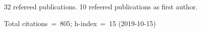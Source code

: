 32 refereed publications. 10 refeered publications as first author.

Total citations~=~805; h-index~=~15 (2019-10-15)